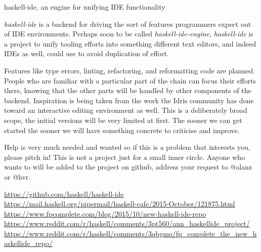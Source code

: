 \documentclass[DIV16,twocolumn,10pt]{scrreprt}
\begin{document}
\begin{hcarentry}{haskell-ide, an engine for unifying IDE functionality}

\makeheader

\textit{haskell-ide} is a backend for driving the sort of features programmers
expect out of IDE environments. Perhaps soon to be called
\textit{haskell-ide-engine}, \textit{haskell-ide} is a project to unify tooling
efforts into something different text editors, and indeed IDEs as well, could
use to avoid duplication of effort.

Features like type errors, linting, refactoring, and reformatting code are
planned. People who are familiar with a particular part of the chain can focus
their efforts there, knowing that the other parts will be handled by other
components of the backend. Inspiration is being taken from the work the Idris
community has done toward an interactive editing environment as well. This is a
deliberately broad scope, the initial versions will be very limited at first.
The sooner we can get started the sooner we will have something concrete to
criticise and improve.

Help is very much needed and wanted so if this is a problem that interests you,
please pitch in! This is not a project just for a small inner circle. Anyone who
wants to will be added to the project on github, address your request to @alanz
or @hvr.

\FurtherReading
  \url{https://github.com/haskell/haskell-ide} \\
  \url{https://mail.haskell.org/pipermail/haskell-cafe/2015-October/121875.html} \\
  \url{https://www.fpcomplete.com/blog/2015/10/new-haskell-ide-repo} \\
  \url{https://www.reddit.com/r/haskell/comments/3pt560/ann_haskellide_project/} \\
  \url{https://www.reddit.com/r/haskell/comments/3qbgmo/fp_complete_the_new_haskellide_repo/}

\end{hcarentry}
\end{document}
